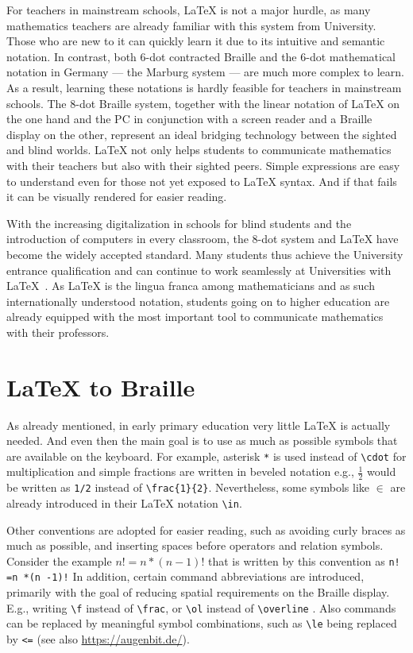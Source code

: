 \documentclass{easychair}
\begin{document}
For teachers in mainstream schools, {\LaTeX} is not a major hurdle, as many
mathematics teachers are already familiar with this system from
University. Those who are new to it can quickly learn it due to its intuitive
and semantic notation.  In contrast, both 6-dot contracted Braille and the 6-dot
mathematical notation in Germany --- the Marburg system --- are much more
complex to learn. As a result, learning these notations is hardly feasible
for teachers in mainstream schools. The 8-dot Braille system, together with the
linear notation of {\LaTeX} on the one hand and the PC in conjunction with a
screen reader and a Braille display on the other, represent an ideal bridging
technology between the sighted and blind worlds. {\LaTeX} not only helps
students to communicate mathematics with their teachers but also with their
sighted peers. Simple expressions are easy to understand even for those not yet
exposed to {\LaTeX} syntax. And if that fails it can be visually rendered for
easier reading.

With the increasing digitalization in schools for blind students and the
introduction of computers in every classroom, the 8-dot system and {\LaTeX} have
become the widely accepted standard. Many students thus achieve the University
entrance qualification and can continue to work seamlessly at Universities with
{\LaTeX}~\cite{bexten2002latex}. As {\LaTeX} is the lingua franca among
mathematicians and as such internationally understood notation, students going
on to higher education are already equipped with the most important tool to
communicate mathematics with their professors.


\section{{\LaTeX} to Braille}\label{sec:latex-to-Braille}

As already mentioned, in early primary education very little {\LaTeX} is actually
needed. And even then the main goal is to use as much as possible symbols that
are available on the keyboard. For example, asterisk \texttt{*} is used instead
of \verb+\cdot+ for multiplication and simple fractions are written in beveled
notation e.g., $\frac{1}{2}$ would be written as \texttt{1/2} instead of
\verb+\frac{1}{2}+. Nevertheless, some symbols like $\in$ are already introduced
in their {\LaTeX} notation \verb+\in+.

Other conventions are adopted for easier reading, such as avoiding curly braces
as much as possible, and inserting spaces before operators and relation
symbols. Consider the example ${ n! = n*(n-1)! }$ that is written by
this convention as \verb+n! =n *(n -1)!+ In addition, certain command abbreviations
are introduced, primarily with the goal of reducing spatial requirements on the
Braille display. E.g., writing \verb+\f+ instead of \verb+\frac+, or \verb+\ol+
instead of \verb+\overline+ . Also commands can be replaced by meaningful symbol
combinations, such as \verb+\le+ being replaced by \verb+<=+ (see also
\url{https://augenbit.de/}).
\end{document}

